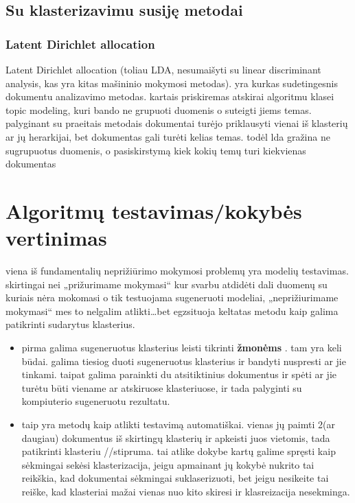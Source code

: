 \documentclass{VUMIFInfKursinis}
\begin{document}
	\subsection{Su klasterizavimu susiję metodai}

		\subsubsection{Latent Dirichlet allocation}
			Latent Dirichlet allocation (toliau LDA, nesumaišyti su linear discriminant analysis, kas yra kitas mašininio mokymosi metodas). yra kurkas sudetingesnis dokumentu analizavimo metodas. kartais priskiremas atskirai algoritmu klasei topic modeling, kuri bando ne grupuoti duomenis o suteigti jiems temas. palyginant su praeitais metodais dokumentai turėjo priklausyti vienai iš klasterių ar jų herarkijai, bet dokumentas gali turėti kelias temas. 
			todėl lda gražina ne sugrupuotus duomenis, o pasiskirstymą kiek kokių temų turi kiekvienas dokumentas  

\section{Algoritmų testavimas/kokybės vertinimas}
	viena iš fundamentalių neprižiūrimo mokymosi problemų yra modelių testavimas. skirtingai nei „prižurimame mokymasi“ kur svarbu atdidėti dali duomenų su kuriais nėra mokomasi o tik testuojama sugeneruoti modeliai, „neprižiurimame mokymasi“ mes to nelgalim atlikti\ldots bet egzsituoja keltatas metodu kaip galima patikrinti sudarytus klasterius.
	\begin{itemize}
		\item pirma galima sugeneruotus klasterius leisti tikrinti \textbf{žmonėms }. tam yra keli būdai. galima tiesiog duoti sugeneruotus klasterius ir bandyti nuspresti ar jie tinkami. taipat galima parainkti du atsitiktinius dokumentus ir spėti ar jie turėtu būti viename ar atskiruose klasteriuose, ir tada palyginti su kompiuterio sugeneruotu rezultatu. 
		\item taip yra metodų kaip atlikti testavimą automatiškai. vienas jų paimti 2(ar daugiau) dokumentus iš skirtingų klasterių ir apkeisti juos vietomis, tada patikrinti klasteriu //stipruma. tai atlike dokybe kartų galime spręsti kaip sėkmingai sekėsi klasterizacija, jeigu apmainant jų kokybė nukrito tai reikškia, kad dokumentai sėkmingai suklaserizuoti, bet jeigu nesikeite tai reiške, kad klasteriai mažai vienas nuo kito skiresi ir klasreizacija nesekminga.
	\end{itemize}
\end{document}
